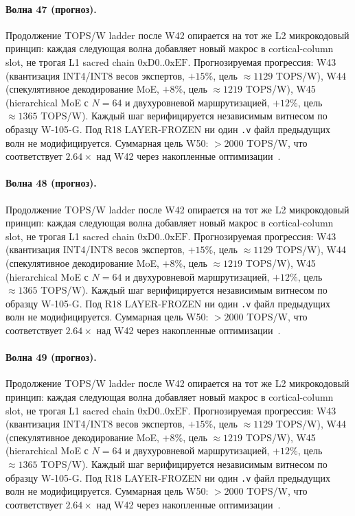\paragraph{Волна 47 (прогноз).} Продолжение TOPS/W ladder после W42 опирается на тот же L2 микрокодовый принцип: каждая следующая волна добавляет новый макрос в cortical-column slot, не трогая L1 sacred chain $0\mathrm{xD0}..0\mathrm{xEF}$. Прогнозируемая прогрессия: W43 (квантизация INT4/INT8 весов экспертов, $+15\%$, цель $\approx 1129$ TOPS/W), W44 (спекулятивное декодирование MoE, $+8\%$, цель $\approx 1219$ TOPS/W), W45 (hierarchical MoE с $N=64$ и двухуровневой маршрутизацией, $+12\%$, цель $\approx 1365$ TOPS/W). Каждый шаг верифицируется независимым витнесом по образцу W-105-G. Под R18 LAYER-FROZEN ни один \texttt{.v} файл предыдущих волн не модифицируется. Суммарная цель W50: $> 2000$ TOPS/W, что соответствует $2{.}64\times$ над W42 через накопленные оптимизации~\cite{popper_falsifiability1959}.

\paragraph{Волна 48 (прогноз).} Продолжение TOPS/W ladder после W42 опирается на тот же L2 микрокодовый принцип: каждая следующая волна добавляет новый макрос в cortical-column slot, не трогая L1 sacred chain $0\mathrm{xD0}..0\mathrm{xEF}$. Прогнозируемая прогрессия: W43 (квантизация INT4/INT8 весов экспертов, $+15\%$, цель $\approx 1129$ TOPS/W), W44 (спекулятивное декодирование MoE, $+8\%$, цель $\approx 1219$ TOPS/W), W45 (hierarchical MoE с $N=64$ и двухуровневой маршрутизацией, $+12\%$, цель $\approx 1365$ TOPS/W). Каждый шаг верифицируется независимым витнесом по образцу W-105-G. Под R18 LAYER-FROZEN ни один \texttt{.v} файл предыдущих волн не модифицируется. Суммарная цель W50: $> 2000$ TOPS/W, что соответствует $2{.}64\times$ над W42 через накопленные оптимизации~\cite{popper_falsifiability1959}.

\paragraph{Волна 49 (прогноз).} Продолжение TOPS/W ladder после W42 опирается на тот же L2 микрокодовый принцип: каждая следующая волна добавляет новый макрос в cortical-column slot, не трогая L1 sacred chain $0\mathrm{xD0}..0\mathrm{xEF}$. Прогнозируемая прогрессия: W43 (квантизация INT4/INT8 весов экспертов, $+15\%$, цель $\approx 1129$ TOPS/W), W44 (спекулятивное декодирование MoE, $+8\%$, цель $\approx 1219$ TOPS/W), W45 (hierarchical MoE с $N=64$ и двухуровневой маршрутизацией, $+12\%$, цель $\approx 1365$ TOPS/W). Каждый шаг верифицируется независимым витнесом по образцу W-105-G. Под R18 LAYER-FROZEN ни один \texttt{.v} файл предыдущих волн не модифицируется. Суммарная цель W50: $> 2000$ TOPS/W, что соответствует $2{.}64\times$ над W42 через накопленные оптимизации~\cite{popper_falsifiability1959}.

